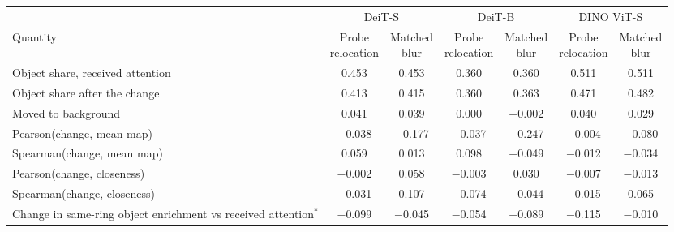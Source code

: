 \begin{tabular}{lcccccc}
\toprule
 & \multicolumn{2}{c}{DeiT-S} & \multicolumn{2}{c}{DeiT-B} & \multicolumn{2}{c}{DINO ViT-S} \\
\cmidrule(lr){2-3} \cmidrule(lr){4-5} \cmidrule(lr){6-7}
Quantity & \makecell[c]{Probe \\ relocation} & \makecell[c]{Matched \\ blur} & \makecell[c]{Probe \\ relocation} & \makecell[c]{Matched \\ blur} & \makecell[c]{Probe \\ relocation} & \makecell[c]{Matched \\ blur} \\
\midrule
Object share, received attention & 0.453 & 0.453 & 0.360 & 0.360 & 0.511 & 0.511 \\
Object share after the change & 0.413 & 0.415 & 0.360 & 0.363 & 0.471 & 0.482 \\
Moved to background & 0.041 & 0.039 & 0.000 & $-$0.002 & 0.040 & 0.029 \\
Pearson(change, mean map) & $-$0.038 & $-$0.177 & $-$0.037 & $-$0.247 & $-$0.004 & $-$0.080 \\
Spearman(change, mean map) & 0.059 & 0.013 & 0.098 & $-$0.049 & $-$0.012 & $-$0.034 \\
Pearson(change, closeness) & $-$0.002 & 0.058 & $-$0.003 & 0.030 & $-$0.007 & $-$0.013 \\
Spearman(change, closeness) & $-$0.031 & 0.107 & $-$0.074 & $-$0.044 & $-$0.015 & 0.065 \\
\midrule
\makecell[l]{Change in same-ring object \\ enrichment vs received attention$^\ast$} & $-$0.099 & $-$0.045 & $-$0.054 & $-$0.089 & $-$0.115 & $-$0.010 \\
\bottomrule
\end{tabular}
